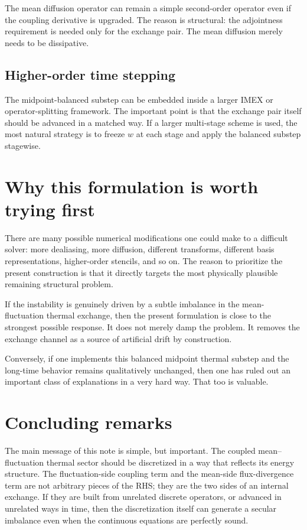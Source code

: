 \documentclass[11pt]{article}
\begin{document}
The mean diffusion operator can remain a simple second-order operator even if the coupling derivative is upgraded. The reason is structural: the adjointness requirement is needed only for the exchange pair. The mean diffusion merely needs to be dissipative.

\subsection{Higher-order time stepping}

The midpoint-balanced substep can be embedded inside a larger IMEX or operator-splitting framework. The important point is that the exchange pair itself should be advanced in a matched way. If a larger multi-stage scheme is used, the most natural strategy is to freeze $w$ at each stage and apply the balanced substep stagewise.

\section{Why this formulation is worth trying first}

There are many possible numerical modifications one could make to a difficult solver: more dealiasing, more diffusion, different transforms, different basis representations, higher-order stencils, and so on. The reason to prioritize the present construction is that it directly targets the most physically plausible remaining structural problem.

If the instability is genuinely driven by a subtle imbalance in the mean-fluctuation thermal exchange, then the present formulation is close to the strongest possible response. It does not merely damp the problem. It removes the exchange channel as a source of artificial drift by construction.

Conversely, if one implements this balanced midpoint thermal substep and the long-time behavior remains qualitatively unchanged, then one has ruled out an important class of explanations in a very hard way. That too is valuable.

\section{Concluding remarks}

The main message of this note is simple, but important. The coupled mean--fluctuation thermal sector should be discretized in a way that reflects its energy structure. The fluctuation-side coupling term and the mean-side flux-divergence term are not arbitrary pieces of the RHS; they are the two sides of an internal exchange. If they are built from unrelated discrete operators, or advanced in unrelated ways in time, then the discretization itself can generate a secular imbalance even when the continuous equations are perfectly sound.
\end{document}

